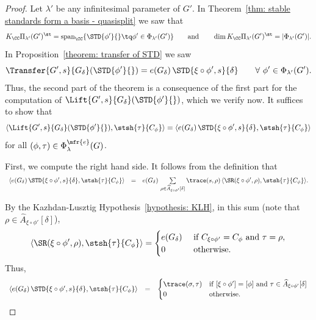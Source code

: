 \documentclass[11pt,letterpaper]{amsart}
\numberwithin{equation}{section}
\begin{document}
\begin{proof}
Let $\lambda'$ be any infinitesimal parameter of $G'$.
In Theorem~\ref{thm: stable standards form a basis - quasisplit} we saw that 
\[
K_\CC \Pi_{\lambda'}(G')^{\st}
=
\operatorname{span}_\CC\{ 
\STD{\phi'}{} \tq \phi'\in \Phi_{\lambda'}(G') \} 
\qquad\mathrm{and}\qquad
\dim K_\CC \Pi_{\lambda'}(G')^{\st}
= 
| \Phi_{\lambda'}(G') |.
\]
In Proposition~\ref{theorem: transfer of STD} we saw 
\[
\Transfer{G',s}{G_\delta}(\STD{\phi'}{}) 
= 
e(G_\delta)\, 
 \STD{\xi\circ\phi',s}{\delta}
\qquad \forall\ 
\phi'\in \Phi_{\lambda'}(G').
\]
Thus, the second part of the theorem is a consequence of the first part for the computation of $\Lift{G',s}{G_\delta}(\STD{\phi'}{})$, which we verify now.
It suffices to show that 
\[ \langle 
    \Lift{G',s}{G_\delta}(\STD{\phi'}{}), \stsh{\tau}{C_{\phi}} \rangle= \langle 
    e(G_\delta)\,
    \STD{\xi\circ\phi',{s}}{\delta}, \stsh{\tau}{C_{\phi}} \rangle\]
    for all $(\phi,\tau) \in \Phi_{\lambda}^{\mfr{e}}(G)$.

First, we compute the right hand side. It follows from the definition that
\begin{equation}\label{equation: Lift=Trans 0}
    \begin{array}{rcl}
    
    \langle 
    e(G_\delta)\,
    \STD{\xi\circ\phi',{s}}{\delta}, \stsh{\tau}{C_{\phi}} \rangle \vspace{0.5em}  
    &=& 
    e(G_\delta)\,
    \sum\limits_{\rho\in \widehat{A}_{\xi\circ\phi'}[\delta]} \trace(s, \rho)\, 
    \langle \SR(\xi\circ\phi',\rho), \stsh{\tau}{C_{\phi}}  \rangle.
    \end{array}
\end{equation}
By the Kazhdan-Lusztig Hypothesis~\ref{hypothesis: KLH}, in this sum (note that $\rho \in \widehat{A}_{\xi\circ\phi'}[\delta]$),
\[ 
\langle \SR(\xi\circ\phi',\rho), \stsh{\tau}{C_{\phi}} \rangle
= 
\begin{cases}
    e(G_\delta) &\text{ if } C_{\xi\circ\phi'}=C_{\phi} \text{ and } \tau=\rho,\\
    0 &\text{ otherwise.}
\end{cases}
\]
Thus,
\begin{equation}\label{eq Lift=trans RHS}
    \begin{array}{rcl}
   \langle 
    e(G_\delta)\,
    \STD{\xi\circ\phi',{s}}{\delta}, \stsh{\tau}{C_{\phi}} \rangle
    &=&
    \begin{cases}
     \trace(\sigma, \tau) & \text{if }  [\xi\circ\phi'] = [\phi] \text{ and }\tau \in \widehat{A}_{\xi\circ\phi'}[\delta]\\
     0 & \text{otherwise}.
     \end{cases}
    \end{array}
\end{equation}


\end{proof}
\end{document}
